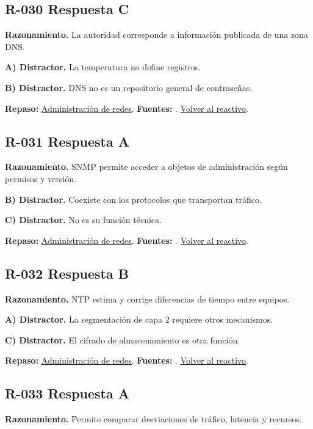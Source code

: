 \subsection*{R-030 \quad Respuesta C}\label{s:R-030}
\textbf{Razonamiento.} La autoridad corresponde a información publicada de una zona DNS.

\textbf{A) Distractor. }La temperatura no define registros.

\textbf{B) Distractor. }DNS no es un repositorio general de contraseñas.

\textbf{Repaso:} \hyperref[sec:r2]{Administración de redes}. \textbf{Fuentes:} \cite{rfc2131,rfc1034,rfc9293,networks}. \hyperref[q:R-030]{Volver al reactivo}.\par\medskip

\subsection*{R-031 \quad Respuesta A}\label{s:R-031}
\textbf{Razonamiento.} SNMP permite acceder a objetos de administración según permisos y versión.

\textbf{B) Distractor. }Coexiste con los protocolos que transportan tráfico.

\textbf{C) Distractor. }No es su función técnica.

\textbf{Repaso:} \hyperref[sec:r2]{Administración de redes}. \textbf{Fuentes:} \cite{rfc2131,rfc1034,rfc9293,networks}. \hyperref[q:R-031]{Volver al reactivo}.\par\medskip

\subsection*{R-032 \quad Respuesta B}\label{s:R-032}
\textbf{Razonamiento.} NTP estima y corrige diferencias de tiempo entre equipos.

\textbf{A) Distractor. }La segmentación de capa 2 requiere otros mecanismos.

\textbf{C) Distractor. }El cifrado de almacenamiento es otra función.

\textbf{Repaso:} \hyperref[sec:r2]{Administración de redes}. \textbf{Fuentes:} \cite{rfc2131,rfc1034,rfc9293,networks}. \hyperref[q:R-032]{Volver al reactivo}.\par\medskip

\subsection*{R-033 \quad Respuesta A}\label{s:R-033}
\textbf{Razonamiento.} Permite comparar desviaciones de tráfico, latencia y recursos.

